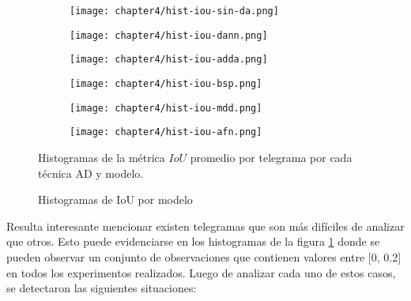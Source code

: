 \begin{figure}[H]
    \centering
    \begin{subfigure}[h]{0.40\textwidth}
        \texttt{[image: chapter4/hist-iou-sin-da.png]}
    \end{subfigure}
    \hfill
    \begin{subfigure}[h]{0.40\textwidth}
        \texttt{[image: chapter4/hist-iou-dann.png]}
    \end{subfigure}
    \hfill
    \begin{subfigure}[h]{0.40\textwidth}
        \texttt{[image: chapter4/hist-iou-adda.png]}
    \end{subfigure}
    \hfill
    \begin{subfigure}[h]{0.40\textwidth}
        \texttt{[image: chapter4/hist-iou-bsp.png]}
    \end{subfigure}
    \hfill
    \begin{subfigure}[h]{0.40\textwidth}
        \texttt{[image: chapter4/hist-iou-mdd.png]}
    \end{subfigure}
    \hfill
    \begin{subfigure}[h]{0.40\textwidth}
        \texttt{[image: chapter4/hist-iou-afn.png]}
    \end{subfigure}

    \caption{Histogramas de IoU por modelo}{Histogramas de la métrica $IoU$ promedio por telegrama por cada técnica AD y modelo.}
    \label{fig:histogramas-ious}
\end{figure}

Resulta interesante mencionar existen telegramas que son más difíciles de analizar que otros. Esto puede evidenciarse
en los histogramas de la figura \ref{fig:histogramas-ious} donde se pueden observar un conjunto de observaciones que
contienen valores entre [0, 0.2] en todos los experimentos realizados. Luego de analizar cada uno de estos casos, se
detectaron las siguientes situaciones:


